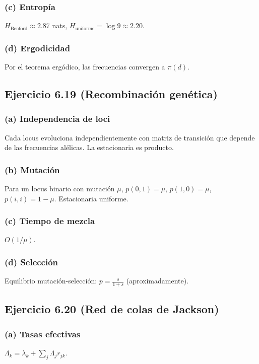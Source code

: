 \documentclass[letterpaper, 12pt]{article}
\newcommand{\1}{\mathbbm{1}}
\begin{document}
    \subsubsection*{(c) Entrop\'ia}
    $H_{\text{Benford}}\approx2.87$ nats, $H_{\text{uniforme}}=\log9\approx2.20$.

    \subsubsection*{(d) Ergodicidad}
    Por el teorema erg\'odico, las frecuencias convergen a $\pi(d)$.

    \subsection{Ejercicio 6.19 (Recombinaci\'on gen\'etica)}

    \subsubsection*{(a) Independencia de loci}
    Cada locus evoluciona independientemente con matriz de transici\'on que depende de las frecuencias al\'elicas. La estacionaria es producto.

    \subsubsection*{(b) Mutaci\'on}
    Para un locus binario con mutaci\'on $\mu$, $p(0,1)=\mu$, $p(1,0)=\mu$, $p(i,i)=1-\mu$. Estacionaria uniforme.

    \subsubsection*{(c) Tiempo de mezcla}
    $O(1/\mu)$.

    \subsubsection*{(d) Selecci\'on}
    Equilibrio mutación-selección: $p=\frac{s}{1+s}$ (aproximadamente).

    \subsection{Ejercicio 6.20 (Red de colas de Jackson)}

    \subsubsection*{(a) Tasas efectivas}
    $\Lambda_k=\lambda_k+\sum_j\Lambda_j r_{jk}$.
\end{document}
